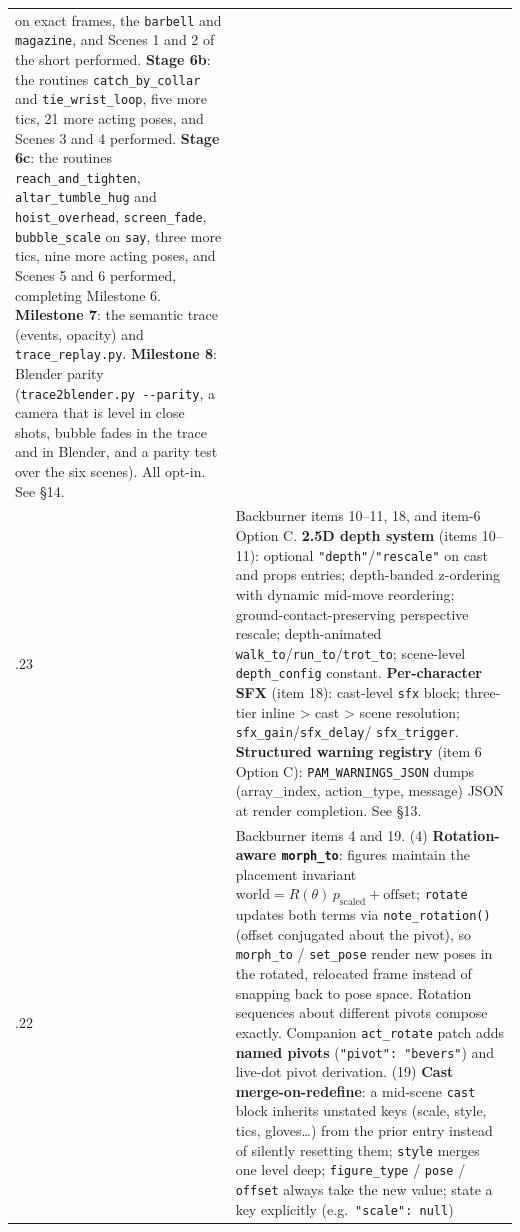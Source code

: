 \documentclass[
  12pt,
  letterpaper,
]{book}
\begin{document}
\begin{longtable}[]{@{}
  >{\raggedright\arraybackslash}p{}
  >{\raggedright\arraybackslash}p{}@{}}
on exact frames, the \texttt{barbell} and \texttt{magazine}, and Scenes
1 and 2 of the short performed. \textbf{Stage 6b}: the routines
\texttt{catch\_by\_collar} and \texttt{tie\_wrist\_loop}, five more tics,
21 more acting poses, and Scenes 3 and 4 performed. \textbf{Stage 6c}:
the routines \texttt{reach\_and\_tighten}, \texttt{altar\_tumble\_hug}
and \texttt{hoist\_overhead}, \texttt{screen\_fade}, \texttt{bubble\_scale}
on \texttt{say}, three more tics, nine more acting poses, and Scenes 5
and 6 performed, completing Milestone 6. \textbf{Milestone 7}: the
semantic trace (events, opacity) and \texttt{trace\_replay.py}.
\textbf{Milestone 8}: Blender parity (\texttt{trace2blender.py
-{}-parity}, a camera that is level in close shots, bubble fades in the
trace and in Blender, and a parity test over the six scenes). All
opt-in. See \S14. \\
0.9.23 & Backburner items 10--11, 18, and item-6 Option C.
\textbf{2.5D depth system} (items 10--11): optional
\texttt{"depth"}/\texttt{"rescale"} on cast and props entries;
depth-banded z-ordering with dynamic mid-move reordering;
ground-contact-preserving perspective rescale; depth-animated
\texttt{walk\_to}/\texttt{run\_to}/\texttt{trot\_to}; scene-level
\texttt{depth\_config} constant. \textbf{Per-character SFX}
(item 18): cast-level \texttt{sfx} block; three-tier inline > cast >
scene resolution; \texttt{sfx\_gain}/\texttt{sfx\_delay}/
\texttt{sfx\_trigger}. \textbf{Structured warning registry}
(item 6 Option C): \texttt{PAM\_WARNINGS\_JSON} dumps
(array\_index, action\_type, message) JSON at render completion.
See \S13. \\
0.9.22 & Backburner items 4 and 19. (4) \textbf{Rotation-aware
\texttt{morph\_to}}: figures maintain the placement invariant
$\mathrm{world} = R(\theta)\,p_{\mathrm{scaled}} + \mathrm{offset}$;
\texttt{rotate} updates both terms via \texttt{note\_rotation()}
(offset conjugated about the pivot), so \texttt{morph\_to} /
\texttt{set\_pose} render new poses in the rotated, relocated frame
instead of snapping back to pose space. Rotation sequences about
different pivots compose exactly. Companion \texttt{act\_rotate}
patch adds \textbf{named pivots} (\texttt{"pivot": "bevers"}) and
live-dot pivot derivation. (19) \textbf{Cast merge-on-redefine}: a
mid-scene \texttt{cast} block inherits unstated keys (scale, style,
tics, gloves\ldots) from the prior entry instead of silently
resetting them; \texttt{style} merges one level deep;
\texttt{figure\_type} / \texttt{pose} / \texttt{offset} always take
the new value; state a key explicitly (e.g.\ \texttt{"scale": null})

\end{longtable}
\end{document}
